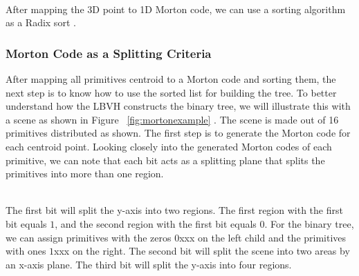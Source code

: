 \documentclass[11pt,a4paper]{article}
\begin{document}
\noindent
\\
After mapping the 3D point to 1D Morton code, we can use a sorting algorithm as a Radix sort \protect\cite{Karras2012}.

\subsubsection{Morton Code as a Splitting Criteria}
After mapping all primitives centroid to a Morton code and sorting them, the next step is to know how to use the sorted list for building the tree. To better understand how the LBVH constructs the binary tree, we will illustrate this with a scene as shown in Figure ~\ref{fig:mortonexample}
. The scene is made out of 16 primitives distributed as shown. The first step is to generate the Morton code for each centroid point. Looking closely into the generated Morton codes of each primitive, we can note that each bit acts as a splitting plane that splits the primitives into more than one region. 

\noindent
\\
The first bit will split the y-axis into two regions. The first region with the first bit equals $1$, and the second region with the first bit equals $0$. For the binary tree, we can assign primitives with the zeros $0$xxx on the left child and the primitives with ones $1$xxx on the right. The second bit will split the scene into two areas by an x-axis plane. The third bit will split the y-axis into four regions.
\end{document}

